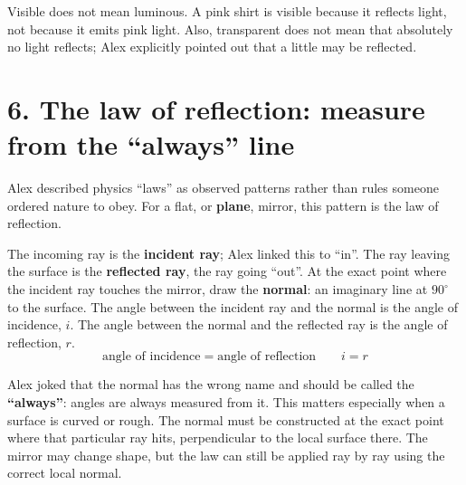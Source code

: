 \documentclass[11pt,a4paper]{article}
\begin{document}
\begin{mistakebox}
Visible does not mean luminous. A pink shirt is visible because it reflects light, not because it emits pink light. Also, transparent does not mean that absolutely no light reflects; Alex explicitly pointed out that a little may be reflected.
\end{mistakebox}

\section*{6. The law of reflection: measure from the ``always'' line}
Alex described physics ``laws'' as observed patterns rather than rules someone ordered nature to obey. For a flat, or \textbf{plane}, mirror, this pattern is the law of reflection.

The incoming ray is the \textbf{incident ray}; Alex linked this to ``in''. The ray leaving the surface is the \textbf{reflected ray}, the ray going ``out''. At the exact point where the incident ray touches the mirror, draw the \textbf{normal}: an imaginary line at $90^\circ$ to the surface. The angle between the incident ray and the normal is the angle of incidence, $i$. The angle between the normal and the reflected ray is the angle of reflection, $r$.
\[
\boxed{\text{angle of incidence}=\text{angle of reflection}\qquad i=r}
\]

\begin{center}
\end{center}

Alex joked that the normal has the wrong name and should be called the \textbf{``always''}: angles are always measured from it. This matters especially when a surface is curved or rough. The normal must be constructed at the exact point where that particular ray hits, perpendicular to the local surface there. The mirror may change shape, but the law can still be applied ray by ray using the correct local normal.
\end{document}
